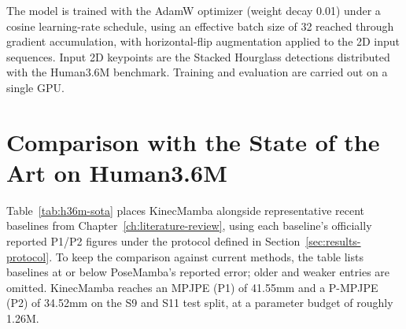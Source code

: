 The model is trained with the AdamW optimizer (weight decay 0.01) under a
cosine learning-rate schedule, using an effective batch size of 32 reached
through gradient accumulation, with horizontal-flip augmentation applied to
the 2D input sequences. Input 2D keypoints are the Stacked Hourglass
detections distributed with the Human3.6M benchmark. Training and evaluation
are carried out on a single GPU.

\section{Comparison with the State of the Art on Human3.6M}
\label{sec:results-h36m}

Table~\ref{tab:h36m-sota} places KinecMamba alongside
representative recent baselines from Chapter~\ref{ch:literature-review},
using each baseline's officially reported P1/P2 figures under the protocol
defined in Section~\ref{sec:results-protocol}. To keep the comparison against
current methods, the table lists baselines at or below PoseMamba's reported
error; older and weaker entries are omitted. KinecMamba reaches an MPJPE (P1)
of 41.55mm and a P-MPJPE (P2) of 34.52mm on the S9 and S11 test split, at a
parameter budget of roughly 1.26M.

